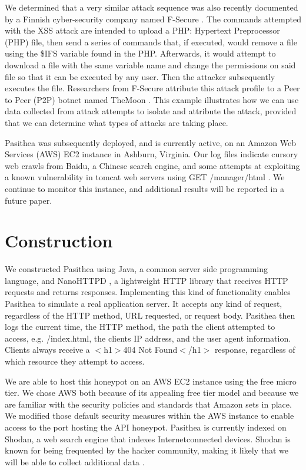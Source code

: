 We determined that a very similar attack sequence was also recently documented by a Finnish cyber-security company named F-Secure \cite{F-Secure}. The commands attempted with the XSS attack are intended to upload a PHP: Hypertext Preprocessor (PHP) file, then send a series of commands that, if executed, would remove a file using the \$IFS variable found in the PHP. Afterwards, it would attempt to download a file with the same variable name and change the permissions on said file so that it can be executed by any user.  Then the attacker subsequently executes the file. Researchers from F-Secure  attribute this attack profile to a Peer to Peer (P2P) botnet named TheMoon \cite{TheMoon}. This example illustrates how we can use data collected from attack attempts to isolate and attribute the attack, provided that we can determine what types of attacks are taking place.

Pasithea was subsequently deployed, and is currently active, on an Amazon Web Services (AWS) EC2 instance in Ashburn, Virginia. Our log files indicate cursory web crawls from Baidu, a Chinese search engine, and some attempts at exploiting a known vulnerability in tomcat web servers using GET /manager/html \cite{Tomcat-Exploit}. We continue to monitor this instance, and additional results will be reported in a future paper.

\section{Construction}
\label{construct}
We constructed Pasithea using Java, a common server side programming language, and NanoHTTPD \cite{Nanohttpd}, a lightweight HTTP library that receives HTTP requests and returns responses.  Implementing this kind of functionality enables Pasithea to simulate a real application server. It accepts any kind of request, regardless of the HTTP method, URL requested, or request body. Pasithea then logs the current time, the HTTP method, the path the client attempted to access, e.g. /index.html, the clients IP address, and the user agent information. Clients always receive a $<$h1$>$404 Not Found$<$/h1$>$ response, regardless of which resource they attempt to access.

We are able to host this honeypot on an AWS EC2 instance using the free micro tier. We chose AWS both because of its appealing free tier model and because we are familiar with the security policies and standards that Amazon sets in place. We modified those default security measures within the AWS instance to enable access to the port hosting the API honeypot. Pasithea is currently indexed on Shodan, a web search engine that indexes Internetconnected devices. Shodan is known for being frequented by the hacker community, making it likely that we will be able to collect additional data \cite{unsavoryChar}.

